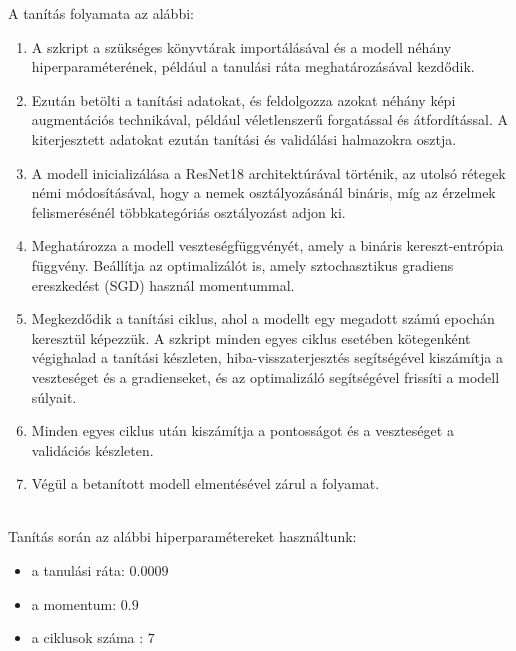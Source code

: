 \documentclass[12pt,a4]{article}
\begin{document}
                    A tanítás folyamata az alábbi: 
                        \begin{enumerate}
                            \item A szkript a szükséges könyvtárak importálásával és a modell néhány hiperparaméterének, például a tanulási ráta meghatározásával kezdődik.

                            \item Ezután betölti a tanítási adatokat, és feldolgozza azokat néhány képi augmentációs technikával, például véletlenszerű forgatással és átfordítással. A kiterjesztett adatokat ezután tanítási és validálási halmazokra osztja.

                            \item A modell inicializálása a ResNet18 architektúrával történik, az utolsó rétegek némi módosításával, hogy a nemek osztályozásánál bináris, míg az érzelmek felismerésénél többkategóriás osztályozást adjon ki. 

                            \item Meghatározza a modell veszteségfüggvényét, amely a bináris kereszt-entrópia függvény. Beállítja az optimalizálót is, amely sztochasztikus gradiens ereszkedést (SGD) használ momentummal.

                            \item Megkezdődik a tanítási ciklus, ahol a modellt egy megadott számú epochán keresztül képezzük. A szkript minden egyes ciklus esetében kötegenként végighalad a tanítási készleten, hiba-visszaterjesztés segítségével kiszámítja a veszteséget és a gradienseket, és az optimalizáló segítségével frissíti a modell súlyait.

                            \item Minden egyes ciklus után kiszámítja a pontosságot és a veszteséget a validációs készleten.

                            \item Végül a betanított modell elmentésével zárul a folyamat.
                        \end{enumerate}\\

                    Tanítás során az alábbi hiperparamétereket használtunk:
                        \begin{itemize}
                            \item a tanulási ráta: $0.0009$ 
                            \item a momentum: $0.9$
                            \item a ciklusok száma : $7$
                        \end{itemize}
\end{document}
